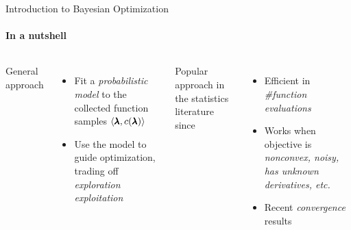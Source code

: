 \begin{frame}[c]{Introduction to Bayesian Optimization}
\framesubtitle{In a nutshell}

\begin{columns}[T]
General approach
\begin{itemize}
    \item <2-> Fit a \emph{probabilistic model} to the collected function samples $\langle{}\pmb{\lambda}, c(\pmb{\lambda})\rangle{}$
    \item <3-> Use the model to guide optimization, trading off \emph{exploration \vs{} exploitation}
\end{itemize}

 Popular approach in the statistics literature since 
\begin{itemize}
    \item <12-> Efficient in \emph{\#function evaluations}
    \item <13-> Works when objective is \emph{nonconvex, noisy, has unknown derivatives, etc.}
    \item <14-> Recent \emph{convergence} results\\ 
\end{itemize}


\end{columns}
\end{frame}
